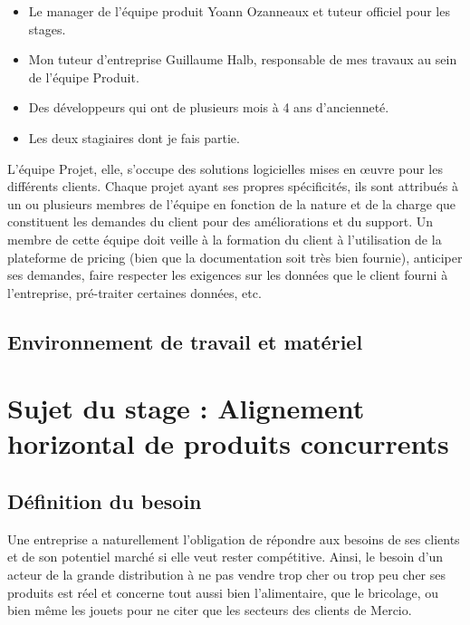 \documentclass{rapportCS}
\begin{document}
\begin{itemize}
\item{Le manager de l'équipe produit Yoann Ozanneaux et tuteur officiel pour les stages.}
\item{Mon tuteur d'entreprise Guillaume Halb, responsable de mes travaux au sein de l'équipe Produit.}
\item{Des développeurs qui ont de plusieurs mois à 4 ans d'ancienneté.}
\item{Les deux stagiaires dont je fais partie.}
\end{itemize}

L'équipe Projet, elle, s'occupe des solutions logicielles mises en œuvre pour les différents clients.
Chaque projet ayant ses propres spécificités, ils sont attribués à un ou plusieurs membres
de l'équipe en fonction de la nature et de la charge que constituent les demandes du 
client pour des améliorations et du support. Un membre de cette équipe doit veille à la formation
du client à l'utilisation de la plateforme de pricing (bien que la documentation soit très bien fournie),
anticiper ses demandes, faire respecter les exigences sur les données que le client fourni à l'entreprise,
pré-traiter certaines données, etc.

\subsection{Environnement de travail et matériel}

\newpage

\section{Sujet du stage : Alignement horizontal de produits concurrents}

\subsection{Définition du besoin}
Une entreprise a naturellement l'obligation de répondre aux besoins de ses clients et de son potentiel marché
si elle veut rester compétitive. Ainsi, le besoin d'un acteur de la grande distribution à ne pas vendre trop cher
ou trop peu cher ses produits est réel et concerne tout aussi bien l'alimentaire, que le bricolage, ou bien même 
les jouets pour ne citer que les secteurs des clients de Mercio.
\end{document}
